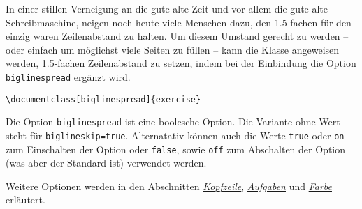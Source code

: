 \documentclass{exercise}
\begin{document}
    In einer stillen Verneigung an die gute alte Zeit und vor allem die gute
    alte Schreibmaschine, neigen noch heute viele Menschen dazu, den 1.5-fachen
    für den einzig waren Zeilenabstand zu halten. Um diesem Umstand gerecht zu
    werden -- oder einfach um möglichst viele Seiten zu füllen -- kann die
    Klasse angeweisen werden, 1.5-fachen Zeilenabstand zu setzen, indem bei
    der Einbindung die Option \lstinline{biglinespread} ergänzt wird.
    \begin{lstlisting}[gobble=6]
      \documentclass[biglinespread]{exercise}
    \end{lstlisting}
    
    Die Option \lstinline{biglinespread} ist eine boolesche Option. Die Variante
    ohne Wert steht für \lstinline{biglineskip=true}. Alternatativ können auch die
    Werte \lstinline{true} oder \lstinline{on} zum Einschalten der Option oder
    \lstinline{false}, sowie \lstinline{off} zum Abschalten der Option (was aber der
    Standard ist) verwendet werden.
    
    Weitere Optionen werden in den Abschnitten
    \emph{\hyperref[section-kopfzeile]{Kopfzeile}},
    \emph{\hyperref[section-aufgaben]{Aufgaben}} und
    \emph{\hyperref[section-farbe]{Farbe}} erläutert.
    
\end{document}
